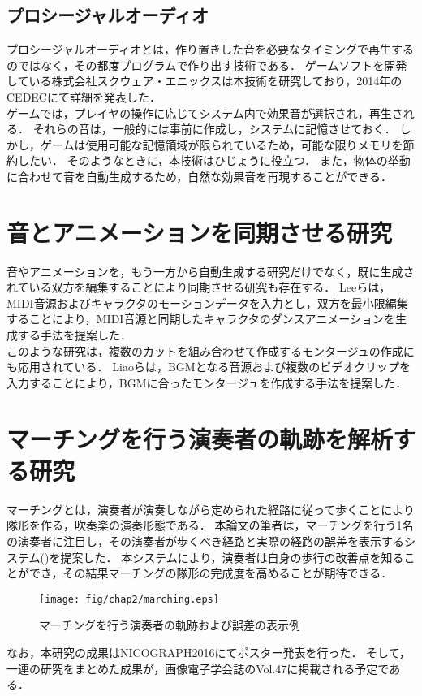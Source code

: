 \subsection{プロシージャルオーディオ}
プロシージャルオーディオとは，作り置きした音を必要なタイミングで再生するのではなく，その都度プログラムで作り出す技術である．
ゲームソフトを開発している株式会社スクウェア・エニックスは本技術を研究しており，2014年のCEDECにて詳細\cite{SQUARE}を発表した．\\
\indent
ゲームでは，プレイヤの操作に応じてシステム内で効果音が選択され，再生される．
それらの音は，一般的には事前に作成し，システムに記憶させておく．
しかし，ゲームは使用可能な記憶領域が限られているため，可能な限りメモリを節約したい．
そのようなときに，本技術はひじょうに役立つ．
また，物体の挙動に合わせて音を自動生成するため，自然な効果音を再現することができる．

\section{音とアニメーションを同期させる研究} \label{sec:synchronization}
音やアニメーションを，もう一方から自動生成する研究だけでなく，既に生成されている双方を編集することにより同期させる研究も存在する．
Leeら\cite{Lee}は，MIDI音源およびキャラクタのモーションデータを入力とし，双方を最小限編集することにより，MIDI音源と同期したキャラクタのダンスアニメーションを生成する手法を提案した．\\
\indent
このような研究は，複数のカットを組み合わせて作成するモンタージュの作成にも応用されている．
Liaoら\cite{Liao}は，BGMとなる音源および複数のビデオクリップを入力することにより，BGMに合ったモンタージュを作成する手法を提案した．

\section{マーチングを行う演奏者の軌跡を解析する研究} \label{sec:marching}
マーチングとは，演奏者が演奏しながら定められた経路に従って歩くことにより隊形を作る，吹奏楽の演奏形態である．
本論文の筆者は，マーチングを行う1名の演奏者に注目し，その演奏者が歩くべき経路と実際の経路の誤差を表示するシステム()を提案した．
本システムにより，演奏者は自身の歩行の改善点を知ることができ，その結果マーチングの隊形の完成度を高めることが期待できる．
\begin{figure}[h]
	\centering
	\texttt{[image: fig/chap2/marching.eps]}
	\caption{マーチングを行う演奏者の軌跡および誤差の表示例}
	\label{fig:marching}
\end{figure}
なお，本研究の成果はNICOGRAPH2016にてポスター発表\cite{nicograph}を行った．
そして，一連の研究をまとめた成果が，画像電子学会誌のVol.47\cite{iieej}に掲載される予定である．

